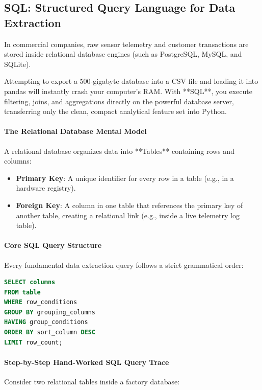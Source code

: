 \subsection{SQL: Structured Query Language for Data Extraction}

\begin{keyidea}
In commercial companies, raw sensor telemetry and customer transactions are stored inside relational database engines (such as PostgreSQL, MySQL, and SQLite). 

Attempting to export a 500-gigabyte database into a CSV file and loading it into pandas will instantly crash your computer's RAM. With **SQL**, you execute filtering, joins, and aggregations directly on the powerful database server, transferring only the clean, compact analytical feature set into Python.
\end{keyidea}

\paragraph{The Relational Database Mental Model}
A relational database organizes data into **Tables** containing rows and columns:
\begin{itemize}
    \item \textbf{Primary Key}: A unique identifier for every row in a table (e.g.,  in a hardware registry).
    \item \textbf{Foreign Key}: A column in one table that references the primary key of another table, creating a relational link (e.g.,  inside a live telemetry log table).
\end{itemize}

\paragraph{Core SQL Query Structure}
Every fundamental data extraction query follows a strict grammatical order:
\begin{lstlisting}[language=SQL]
SELECT columns
FROM table
WHERE row_conditions
GROUP BY grouping_columns
HAVING group_conditions
ORDER BY sort_column DESC
LIMIT row_count;
\end{lstlisting}

\paragraph{Step-by-Step Hand-Worked SQL Query Trace}
Consider two relational tables inside a factory database:

